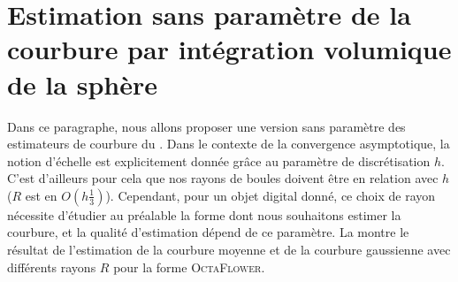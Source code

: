 \section{Estimation sans paramètre de la courbure par intégration volumique de la sphère}
\label{sec:curvature:parameter-free}
%
Dans ce paragraphe, nous allons proposer une version sans paramètre des
estimateurs de courbure du . Dans le contexte
de la convergence asymptotique, la notion d'échelle est explicitement donnée
grâce au paramètre de discrétisation $h$. C'est d'ailleurs pour cela que nos
rayons de boules doivent être en relation avec $h$ ($R$ est en
$O(h\frac{1}{3})$). Cependant, pour un objet digital donné, ce choix de rayon
nécessite d'étudier au préalable la forme dont nous souhaitons estimer la
courbure, et la qualité d'estimation dépend de ce paramètre. La
 montre le résultat de l'estimation de la
courbure moyenne et de la courbure gaussienne avec différents rayons $R$ pour la
forme \textsc{OctaFlower}.
%
